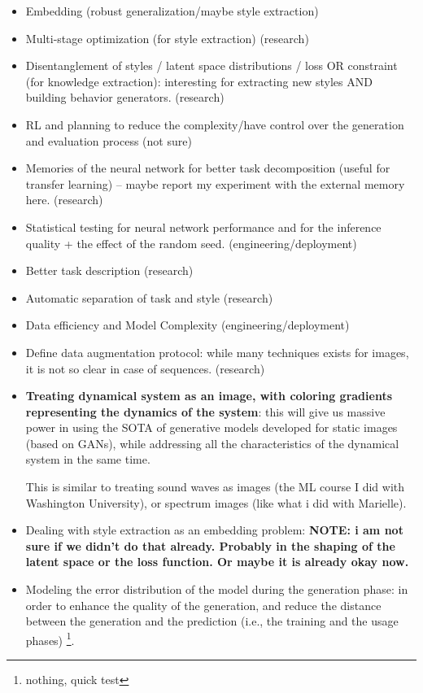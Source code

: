   \begin{itemize}
    \item Embedding (robust generalization/maybe style extraction)
    \item Multi-stage optimization (for style extraction) (research)
    \item Disentanglement of styles / latent space distributions / loss OR constraint (for knowledge extraction): interesting for extracting new styles AND building behavior generators. (research)
    \item RL and planning to reduce the complexity/have control over the generation and evaluation process (not sure)
    \item Memories of the neural network for better task decomposition (useful for transfer learning) -- maybe report my experiment with the external memory here. (research)
    \item Statistical testing for neural network performance and for the inference quality + the effect of the random seed. (engineering/deployment)
    \item Better task description (research)
    \item Automatic separation of task and style (research)
    \item Data efficiency and Model Complexity (engineering/deployment)
    \item Define data augmentation protocol: while many techniques exists for images, it is not so clear in case of sequences. (research)
    \item \textbf{Treating dynamical system as an image, with coloring gradients representing the dynamics of the system}: this will give us massive power in using the SOTA of generative models developed for static images (based on GANs), while addressing all the characteristics of the dynamical system in the same time.

    This is similar to treating sound waves as images (the ML course I did with Washington University), or spectrum images (like what i did with Marielle).

    \item Dealing with style extraction as an embedding problem: \textbf{NOTE: i am not sure if we didn't do that already. Probably in the shaping of the latent space or the loss function. Or maybe it is already okay now. }

    \item Modeling the error distribution of the model during the generation phase: in order to enhance the quality of the generation, and reduce the distance between the generation and the prediction (i.e., the training and the usage phases) \footnote{nothing, quick test}.


\end{itemize}
